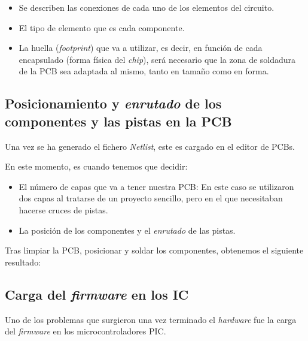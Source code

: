 \begin{itemize}
\item
Se describen las conexiones de cada uno de los elementos del circuito.
\item
El tipo de elemento que es cada componente.
\item
La huella (\emph{footprint}) que va a utilizar, es decir, en función de cada encapsulado (forma física del \emph{chip}), será necesario que la zona de soldadura de la PCB sea adaptada al mismo, tanto en tamaño como en forma.
\end{itemize}


\subsection{Posicionamiento y \textit{enrutado} de los componentes y las pistas en la PCB}\label{posicionamiento_y_enrutado_de_los_componentes_y_las_pistas_en_la_pcb}

Una vez se ha generado el fichero \emph{Netlist}, este es cargado en el editor de PCBs.

En este momento, es cuando tenemos que decidir:

\begin{itemize}
\item
El número de capas que va a tener nuestra PCB: En este caso se utilizaron dos capas al tratarse de un proyecto sencillo, pero en el que necesitaban hacerse cruces de pistas.
\item
La posición de los componentes y el \textit{enrutado} de las pistas.
\end{itemize}





Tras limpiar la PCB, posicionar y soldar los componentes, obtenemos el siguiente resultado:



\subsection{Carga del \emph{firmware} en los IC}\label{carga_firm_pic}

Uno de los problemas que surgieron una vez terminado el \emph{hardware} fue la carga del \emph{firmware}\cite{firmwarePic} en los microcontroladores PIC.

